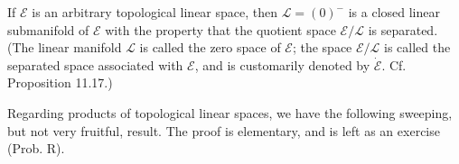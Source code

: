 If $\mathcal{E}$ is an arbitrary topological linear space, then $\mathcal{L} = (0)^-$ is a closed linear submanifold of $\mathcal{E}$ with the property that the quotient space $\mathcal{E}/\mathcal{L}$ is separated. (The linear manifold $\mathcal{L}$ is called the zero space of $\mathcal{E}$; the space $\mathcal{E}/\mathcal{L}$ is called the separated space associated with $\mathcal{E}$, and is customarily denoted by $\dot{\mathcal{E}}$. Cf. Proposition 11.17.)

Regarding products of topological linear spaces, we have the following sweeping, but not very fruitful, result. The proof is elementary, and is left as an exercise (Prob. R).
